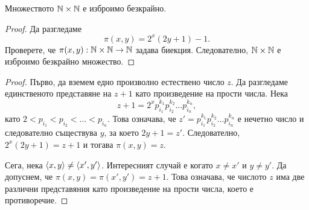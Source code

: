 \begin{prop}
  Множеството $\mathbb{N}\times\mathbb{N}$ е изброимо безкрайно.
\end{prop}
\begin{proof}
  Да разгледаме
  \[\pi(x,y) = 2^x(2y+1)-1.\]
  Проверете, че $\pi(x,y):\mathbb{N}\times\mathbb{N}\to\mathbb{N}$ задава биекция.
  Следователно, $\mathbb{N}\times\mathbb{N}$ е изброимо безкрайно множество.
\end{proof}
\begin{proof}
  Първо, да вземем едно произволно естествено число $z$.
  Да разгледаме единственото представяне на $z+1$ като произведение на прости числа.
  Нека 
  \[z+1 = 2^{x}p^{k_1}_{i_1}p^{k_2}_{i_2}\dots p^{k_n}_{i_n},\] като $2 < p_{i_1} < p_{i_2} < \dots < p_{i_n}$.
  Това означава, че $z' = p^{k_1}_{i_1}p^{k_2}_{i_2}\dots p^{k_n}_{i_n}$ е нечетно число и следователно съществува $y$,
  за което $2y+1 = z'$.
  Следователно, $2^x(2y+1) = z+1$ и тогава $\pi(x,y) = z$.

  Сега, нека $\langle{x,y}\rangle \neq \langle{x',y'}\rangle$.
  Интересният случай е когато $x \neq x'$ и $y \neq y'$.
  Да допуснем, че $\pi(x,y) = \pi(x',y') = z+1$.
  Това означава, че числото $z$ има две различни представяния като произведение на прости числа,
  което е противоречие.
\end{proof}

